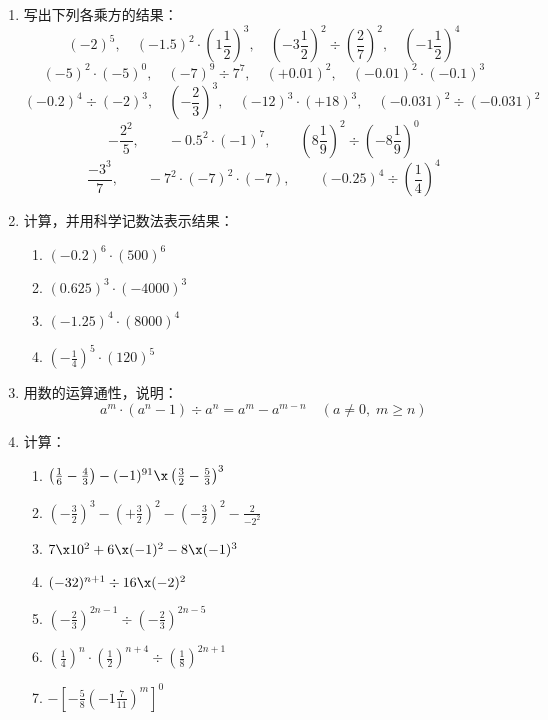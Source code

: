 \begin{enumerate}
	\item 写出下列各乘方的结果：
	\[(-2)^{5},\quad (-1.5)^{2} \cdot\left(1 \frac{1}{2}\right)^{3},\quad  \left(-3 \frac{1}{2}\right)^{2} \div\left(\frac{2}{7}\right)^{2} ,\quad \left(-1 \frac{1}{2}\right)^{4}\]
	\[(-5)^{2} \cdot(-5)^{0} ,\quad(-7)^{9}\div 7^{7} ,\quad (+0.01)^2,\quad (-0.01)^2\cdot (-0.1)^3\]
	\[(-0.2)^4\div (-2)^3,\quad \left(-\frac{2}{3}\right)^3,\quad (-12)^3\cdot (+18)^3,\quad (-0.031)^2\div (-0.031)^2\]
	\[-\frac{2^2}{5},\qquad -0.5^2\cdot (-1)^7,\qquad \left(8\frac{1}{9}\right)^2\div \left(-8\frac{1}{9}\right)^0\]
	\[\frac{-3^3}{7},\qquad -7^2\cdot (-7)^2\cdot (-7),\qquad (-0.25)^4\div \left(\frac{1}{4}\right)^4\]
	
	\item  计算，并用科学记数法表示结果：
	\begin{multicols}{2}
		\begin{enumerate}
			\item $(-0.2)^6\cdot (500)^6$
			\item $(0.625)^3\cdot (-4000)^3$
			\item $(-1.25)^4\cdot (8000)^4$
			\item $\left(-\frac{1}{4}\right)^5\cdot (120)^5$
		\end{enumerate}
	\end{multicols}
	
	\item 用数的运算通性，说明：
	\[a^m\cdot (a^n-1)\div a^n=a^m-a^{m-n}\quad (a\ne 0,\; m\ge n)\]
	
	\item 计算：
	\begin{enumerate}
		\item $\left(\frac{1}{6}-\frac{4}{3}\right)-(-1)^{91}\x \left(\frac{3}{2}-\frac{5}{3}\right)^3$
		\item $\left(-\frac{3}{2}\right)^3-\left(+\frac{3}{2}\right)^2-\left(-\frac{3}{2}\right)^2-\frac{2}{-2^2}$
		\item $7\x 10^2+6\x (-1)^2-8\x (-1)^3$
		\item $(-32)^{n+1}\div 16\x (-2)^2$
		\item $\left(-\frac{2}{3}\right)^{2n-1}\div \left(-\frac{2}{3}\right)^{2n-5}$
		\item $\left(\frac{1}{4}\right)^{n}\cdot \left(\frac{1}{2}\right)^{n+4}\div \left(\frac{1}{8}\right)^{2n+1}$
		\item $-\left[-\frac{5}{8}\left(-1\frac{7}{11}\right)^m\right]^0$
	\end{enumerate}
	

\end{enumerate}
